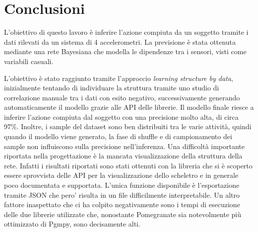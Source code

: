 \documentclass[12pt]{article}
\begin{document}
\section{Conclusioni}

L'obiettivo di questo lavoro è inferire l'azione compiuta da un soggetto tramite i dati rilevati da un sistema di 4 accelerometri. La previsione è stata ottenuta mediante una rete Bayesiana che modella le dipendenze tra i sensori, visti come variabili casuali.\par
L'obiettivo è stato raggiunto tramite l'approccio \textit{learning structure by data}, inizialmente tentando di individuare la struttura tramite uno studio di correlazione manuale tra i dati con esito negativo, successivamente generando automaticamente il modello grazie alle API delle librerie. Il modello finale riesce a inferire l'azione compiuta dal soggetto con una precisione molto alta, di circa 97\%. Inoltre, i sample del dataset sono ben distribuiti tra le varie attività, quindi quando il modello viene generato, la fase di shuffle e di campionamento dei sample non influiscono sulla precisione nell'inferenza. Una difficoltà importante riportata nella progettazione è la mancata visualizzazione della struttura della rete. Infatti i risultati riportati sono stati ottenuti con la libreria \cite{pomegranate} che si è scoperto essere sprovvista delle API per la visualizzazione dello scheletro e in generale poco documentata e supportata. L'unica funzione disponibile è l'esportazione tramite JSON che pero' risulta in un file difficilmente interpretabile.\newline
Un altro fattore inaspettato che ci ha colpito negativamente sono i tempi di esecuzione delle due librerie utilizzate che, nonostante Pomegranate sia notevolmente più ottimizzato di Pgmpy, sono decisamente alti.

\newpage


\end{document}

